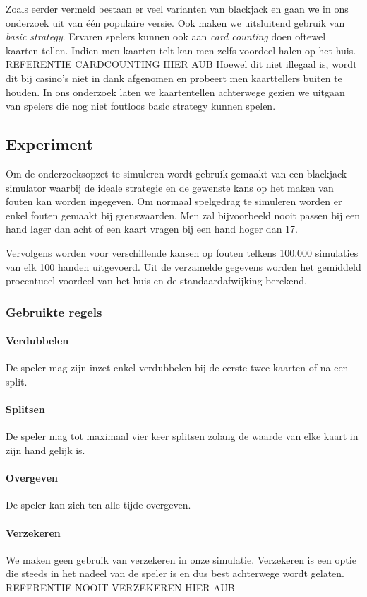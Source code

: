 \documentclass[conference]{IEEEtran}
\begin{document}
Zoals eerder vermeld bestaan er veel varianten van blackjack en gaan we in ons onderzoek uit van \'e\'en populaire versie. Ook maken we uitsluitend gebruik van \textit{basic strategy}. Ervaren spelers kunnen ook aan \textit{card counting} doen oftewel kaarten tellen. Indien men kaarten telt kan men zelfs voordeel halen op het huis. REFERENTIE CARDCOUNTING HIER AUB Hoewel dit niet illegaal is, wordt dit bij casino's niet in dank afgenomen en probeert men kaarttellers buiten te houden. In ons onderzoek laten we kaartentellen achterwege gezien we uitgaan van spelers die nog niet foutloos basic strategy kunnen spelen.

\subsection{Experiment }
Om de onderzoeksopzet te simuleren wordt gebruik gemaakt van een blackjack simulator waarbij de ideale strategie en de gewenste kans op het maken van fouten kan worden ingegeven. Om normaal spelgedrag te simuleren worden er enkel fouten gemaakt bij grenswaarden. Men zal bijvoorbeeld nooit passen bij een hand lager dan acht of een kaart vragen bij een hand hoger dan 17.

Vervolgens worden voor verschillende kansen op fouten telkens 100.000 simulaties van elk 100 handen uitgevoerd. Uit de verzamelde gegevens worden het gemiddeld procentueel voordeel van het huis en de standaardafwijking berekend.

\subsubsection*{Gebruikte regels}
\paragraph{Verdubbelen}
De speler mag zijn inzet enkel verdubbelen bij de eerste twee kaarten of na een split.
\paragraph{Splitsen}
De speler mag tot maximaal vier keer splitsen zolang de waarde van elke kaart in zijn hand gelijk is.
\paragraph{Overgeven}
De speler kan zich ten alle tijde overgeven.
\paragraph{Verzekeren}
We maken geen gebruik van verzekeren in onze simulatie. Verzekeren is een optie die steeds in het nadeel van de speler is en dus best achterwege wordt gelaten. REFERENTIE NOOIT VERZEKEREN HIER AUB
\end{document}
